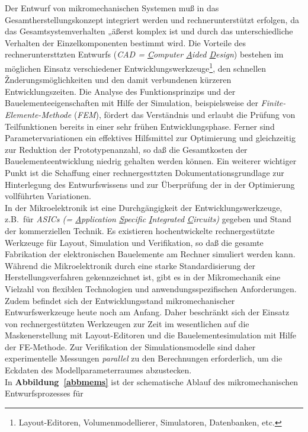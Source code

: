 Der Entwurf von mikromechanischen Systemen muß in das
Gesamtherstellungskonzept integriert werden und rechnerunterstützt
erfolgen, da das Gesamtsystemverhalten „äßerst komplex ist und durch das
unterschiedliche Verhalten der Einzelkomponenten bestimmt wird. Die
Vorteile des rechneruntersttzten Entwurfs ({\em CAD = \underline{C}omputer
\underline{A}ided \underline{D}esign}) bestehen im möglichen Einsatz
verschiedener Entwicklungswerkzeuge\footnote{Layout-Editoren,
Volumenmodellierer, Simulatoren, Datenbanken, etc.},
den schnellen Žnderungsmöglichkeiten
und den damit verbundenen kürzeren Entwicklungszeiten. Die Analyse des
Funktionsprinzips und der Bauelementeeigenschaften mit Hilfe der Simulation,
beispielsweise der {\em Finite-Elemente-Methode} ({\em FEM}), fördert das
Verständnis und erlaubt die Prüfung von Teilfunktionen bereits
in einer sehr frühen Entwicklungsphase. Ferner sind Parametervariationen
ein effektives Hilfsmittel zur Optimierung und gleichzeitig zur
Reduktion der Proto\-typenanzahl, so daß die Gesamtkosten der
Bauelementeentwicklung niedrig gehalten werden können. Ein weiterer
wichtiger Punkt ist die Schaffung einer rechnergesttzten
Dokumentationsgrundlage zur Hinterlegung des Entwurfswissens und zur
Überprüfung der in der Optimierung vollführten Variationen.\\
In der Mikroelektronik ist eine
Durchgängigkeit der Entwicklungswerkzeuge, z.B.\ für {\em ASICs (=
\underline{A}pplication \underline{S}pecific \underline{I}ntegrated
\underline{C}ircuits)} gegeben und Stand der kommerziellen
Technik.  Es existieren hochentwickelte rechnergestützte Werkzeuge für
Layout, Simulation und Verifikation, so daß die gesamte Fabrikation der
elektronischen Bauelemente am Rechner simuliert werden kann. Während
die Mikroelektronik durch eine starke Standardisierung der
Herstellungsverfahren gekennzeichnet ist, gibt es in der Mikromechanik
eine Vielzahl von flexiblen Technologien und anwendungsspezifischen
Anforderungen. Zudem befindet sich der Entwicklungsstand mikromechanischer
Entwurfswerkzeuge heute noch am Anfang. Daher beschränkt sich der
Einsatz von rechnergestützten Werkzeugen zur Zeit im
wesentlichen auf die Maskenerstellung mit Layout-Editoren und die
Bauelemente\-simulation mit Hilfe der FE-Methode. Zur Verifikation der
Simulationsmodelle sind daher experimentelle Messungen {\em parallel}
zu den Berechnungen erforderlich, um die Eckdaten des Modellparameterraumes
abzustecken.\\
%
In {\bf Abbildung~\ref{abbmems}} ist der schematische Ablauf des
mikromechanischen Entwurfsprozesses für

